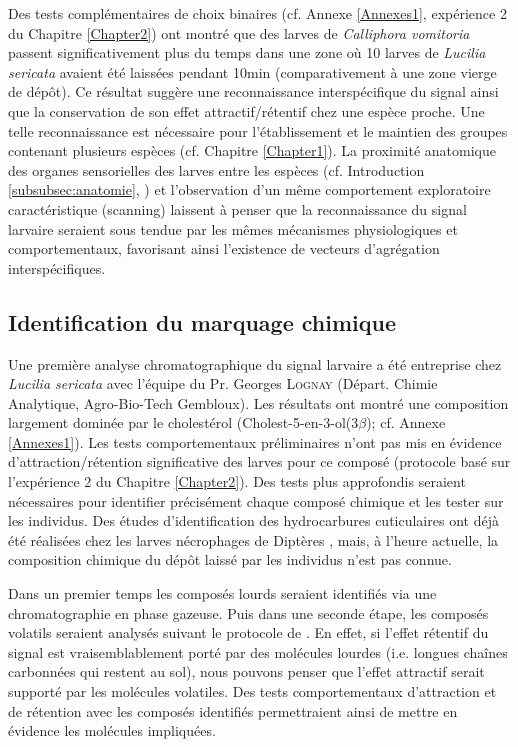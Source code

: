 Des tests complémentaires de choix binaires (cf. Annexe \ref{Annexes1}, expérience 2 du Chapitre \ref{Chapter2}) ont montré que des larves de \textit{Calliphora vomitoria} passent significativement plus du temps dans une zone où 10 larves de \textit{Lucilia sericata} avaient été laissées pendant 10min (comparativement à une zone vierge de dépôt). Ce résultat suggère une reconnaissance interspécifique du signal ainsi que la conservation de son effet attractif/rétentif chez une espèce proche. Une telle reconnaissance est nécessaire pour l'établissement et le maintien des groupes contenant plusieurs espèces (cf. Chapitre \ref{Chapter1}). La proximité anatomique des organes  sensorielles des larves entre les espèces (cf. Introduction \ref{subsubsec:anatomie}, \citep{chu-wang_fine_1971}) et l'observation d'un même comportement exploratoire caractéristique (scanning) laissent à penser que la reconnaissance du signal larvaire seraient sous tendue par les mêmes mécanismes physiologiques et comportementaux, favorisant ainsi l'existence de vecteurs d'agrégation interspécifiques.


			\subsection{Identification du marquage chimique}
Une première analyse chromatographique du signal larvaire a été entreprise chez \textit{Lucilia sericata} avec l'équipe du Pr. Georges \textsc{Lognay} (Départ. Chimie Analytique, Agro-Bio-Tech Gembloux). Les résultats ont montré une composition largement dominée par le cholestérol (Cholest-5-en-3-ol(3$\beta$); cf. Annexe \ref{Annexes1}). Les tests comportementaux préliminaires n'ont pas mis en évidence d'attraction/rétention significative des larves pour ce composé (protocole basé sur l'expérience 2 du Chapitre \ref{Chapter2}). Des tests plus approfondis seraient nécessaires pour identifier précisément chaque composé chimique et les tester sur les individus. Des études d'identification des hydrocarbures cuticulaires ont déjà été réalisées chez les larves nécrophages de Diptères \citep{roux_ontogenetic_2008,zhu_development_2006}, mais, à l'heure actuelle, la composition chimique du dépôt laissé par les individus n'est pas connue.

Dans un premier temps les composés lourds seraient identifiés via une chromatographie en phase gazeuse. Puis dans une seconde étape, les composés volatils seraient analysés suivant le protocole de \citet{frederickx_volatile_2012}. En effet, si l'effet rétentif du signal est vraisemblablement porté par des molécules lourdes (i.e. longues chaînes carbonnées qui restent au sol), nous pouvons penser que l'effet attractif serait supporté par les molécules volatiles. Des tests comportementaux d'attraction et de rétention avec les composés identifiés permettraient ainsi de mettre en évidence les molécules impliquées.

